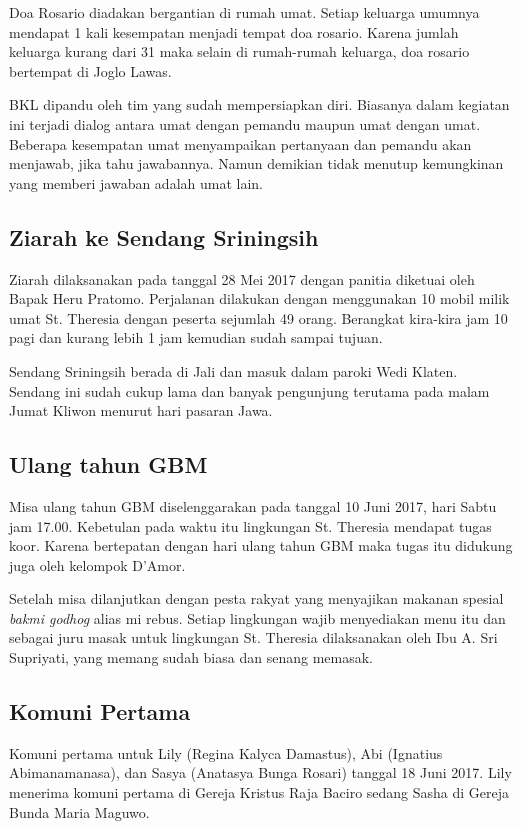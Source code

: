 Doa Rosario diadakan bergantian di rumah umat. Setiap keluarga umumnya mendapat 1 kali kesempatan menjadi tempat doa rosario. Karena jumlah keluarga kurang dari 31 maka selain di rumah-rumah keluarga, doa rosario bertempat di Joglo Lawas. 

BKL dipandu oleh tim yang sudah mempersiapkan diri. Biasanya dalam kegiatan ini terjadi dialog antara umat dengan pemandu maupun umat dengan umat. Beberapa kesempatan umat menyampaikan pertanyaan dan pemandu akan menjawab, jika tahu jawabannya. Namun demikian tidak menutup kemungkinan yang memberi jawaban adalah umat lain. 

\subsection*{Ziarah ke Sendang Sriningsih}
Ziarah dilaksanakan pada tanggal 28 Mei 2017 dengan panitia diketuai oleh Bapak Heru Pratomo. Perjalanan dilakukan dengan menggunakan 10 mobil milik umat St. Theresia dengan peserta sejumlah 49 orang. Berangkat kira-kira jam 10 pagi dan kurang lebih 1 jam kemudian sudah sampai tujuan.

Sendang Sriningsih berada di Jali dan masuk dalam paroki Wedi Klaten. Sendang ini sudah cukup lama dan banyak pengunjung terutama pada malam Jumat Kliwon menurut hari pasaran Jawa.


\subsection*{Ulang tahun GBM}
Misa ulang tahun GBM diselenggarakan pada tanggal 10 Juni 2017, hari Sabtu jam 17.00. Kebetulan pada waktu itu lingkungan St. Theresia mendapat tugas koor. Karena bertepatan dengan hari ulang tahun GBM maka tugas itu didukung juga oleh kelompok D'Amor.

Setelah misa dilanjutkan dengan pesta rakyat yang menyajikan makanan spesial \textit{bakmi godhog} alias mi rebus. Setiap lingkungan wajib menyediakan menu itu dan sebagai juru masak untuk lingkungan St. Theresia dilaksanakan oleh Ibu A. Sri Supriyati, yang memang sudah biasa dan senang memasak.

\subsection*{Komuni Pertama}
Komuni pertama untuk Lily (Regina Kalyca Damastus), Abi (Ignatius Abimanamanasa), dan Sasya (Anatasya Bunga Rosari) tanggal 18 Juni 2017. Lily menerima komuni pertama di Gereja Kristus Raja Baciro sedang Sasha di Gereja Bunda Maria Maguwo.

